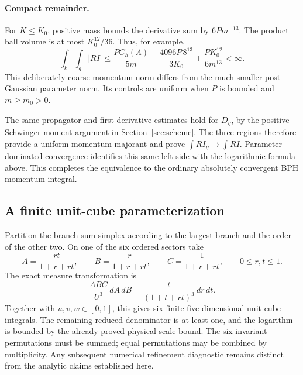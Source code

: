 \paragraph{Compact remainder.}
For $K\le K_0$, positive mass bounds the derivative sum by $6Pm^{-13}$.
The product ball volume is at most $K_0^{12}/36$. Thus, for example,
\[
 \int_k\int_q |RI|
 \le\frac{PC_h(\Lambda)}{5m}
       +\frac{4096P\,8^{13}}{3K_0}
       +\frac{P K_0^{12}}{6m^{13}}<\infty.
\]
This deliberately coarse momentum norm differs from the much smaller
post-Gaussian parameter norm. Its controls are uniform when $P$ is bounded
and $m\ge m_0>0$.

The same propagator and first-derivative estimates hold for $D_\eta$, by
the positive Schwinger moment argument in Section~\ref{sec:scheme}. The
three regions therefore provide a uniform momentum majorant and prove
$\int RI_\eta\to\int RI$. Parameter dominated convergence identifies this
same left side with the logarithmic formula above. This completes the
equivalence to the ordinary absolutely convergent BPH momentum integral.

\subsection{A finite unit-cube parameterization}

Partition the branch-sum simplex according to the largest branch and the
order of the other two. On one of the six ordered sectors take
\[
 A=\frac{rt}{1+r+rt},\qquad
 B=\frac r{1+r+rt},\qquad
 C=\frac1{1+r+rt},\qquad 0\le r,t\le1.
\]
The exact measure transformation is
\[
 \frac{ABC}{U^3}\,dA\,dB
       =\frac{t}{(1+t+rt)^3}\,dr\,dt.
\]
Together with $u,v,w\in[0,1]$, this gives six finite five-dimensional
unit-cube integrals. The remaining reduced denominator is at least one,
and the logarithm is bounded by the already proved physical scale bound.
The six invariant permutations must be summed; equal permutations may be
combined by multiplicity. Any subsequent numerical refinement diagnostic
remains distinct from the analytic claims established here.
